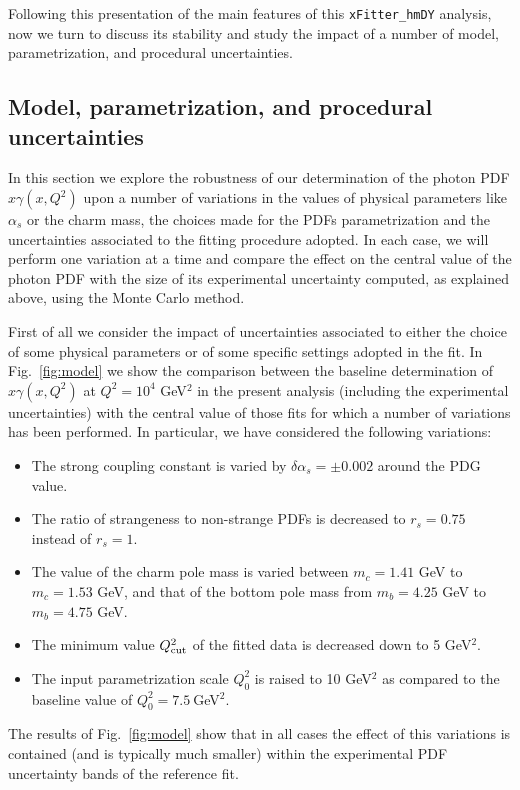 Following this presentation of the main features of this
{\tt xFitter\_hmDY} analysis, now we turn to discuss its stability
and study the impact of a number of model, parametrization,
and procedural uncertainties.

\subsection{Model, parametrization, and procedural uncertainties}

In this section we explore the robustness of our determination of
the photon PDF $x\gamma(x,Q^2)$ upon a number of variations
in the values of physical parameters like $\alpha_s$ or the charm mass,
the choices made for the PDFs parametrization and the uncertainties
associated to the fitting procedure adopted.
%
In each case, we will perform one variation at a time and compare the effect on
the central value of the photon PDF with the size of its experimental uncertainty
computed, as explained above, using the Monte Carlo method.

First of all we consider the impact  of uncertainties associated to either the choice
of some physical parameters or of some specific settings adopted in the fit.
%
In Fig.~\ref{fig:model} we show the comparison between the baseline determination of
  $x\gamma(x,Q^2)$ at $Q^2=10^4$ GeV$^2$ in the present
analysis (including the experimental uncertainties)
with the central value of those  fits for which a number of variations has been performed.
%
In particular, we have considered the following variations:
\begin{itemize}
\item The strong coupling constant is varied by $\delta \alpha_s=\pm 0.002$ around the PDG value.
\item The ratio of strangeness to non-strange PDFs is decreased to $r_s=0.75$ instead of $r_s=1$.
\item The value of the charm pole mass is varied between $m_c=1.41$ GeV to $m_c=1.53$ GeV,
  and that of the bottom pole mass from $m_b=4.25$ GeV to $m_b=4.75$ GeV.
\item The minimum value $Q^2_{\rm cut}$ of the fitted data is decreased down to 5 GeV$^2$.
\item The input parametrization scale $Q_0^2$ is raised to 10 GeV$^2$ as compared
  to the baseline value of $Q_0^2=7.5~$GeV$^2$.
\end{itemize}
The results of Fig.~\ref{fig:model} show that in all cases the effect of this variations
is contained (and is typically much smaller) within the experimental PDF
uncertainty bands of the reference fit.



